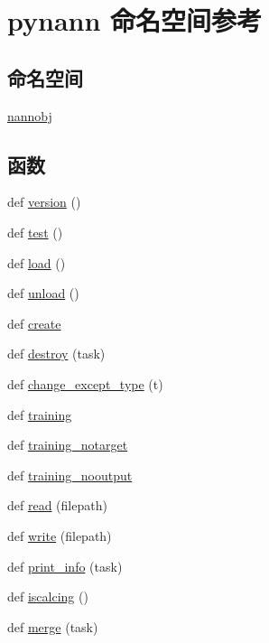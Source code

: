 \hypertarget{namespacepynann}{}\section{pynann 命名空间参考}
\label{namespacepynann}
\subsection*{命名空间}
\begin{DoxyCompactItemize}
\item 
 \hyperlink{namespacepynann_1_1nannobj}{nannobj}
\end{DoxyCompactItemize}
\subsection*{函数}
\begin{DoxyCompactItemize}
\item 
def \hyperlink{namespacepynann_a4dd5d3bc6dc56e2456e6b7f9b7215ab7}{version} ()
\item 
def \hyperlink{namespacepynann_ada5f3e7105e806c2bc05a8e63a32b57e}{test} ()
\item 
def \hyperlink{namespacepynann_ace6e3d4e6aacb9f2d3e26bb3e917ae76}{load} ()
\item 
def \hyperlink{namespacepynann_ad3feafb695c7b9b3c9471dcf601f43e4}{unload} ()
\item 
def \hyperlink{namespacepynann_ab15b41c10f9568d70c75b1c8a41ebdda}{create}
\item 
def \hyperlink{namespacepynann_a1bf1031bdd7b52dc5f2f3e113ae55681}{destroy} (task)
\item 
def \hyperlink{namespacepynann_a4cfc87f32d6180e32a6cff7986ba2a3f}{change\+\_\+except\+\_\+type} (t)
\item 
def \hyperlink{namespacepynann_ae2b74b90563f7fb83c6472fef6aaaeba}{training}
\item 
def \hyperlink{namespacepynann_a00afa3409ad462a7cc3c2d8914dc80c6}{training\+\_\+notarget}
\item 
def \hyperlink{namespacepynann_a3f39ce22cdaec6e20913632fc10b0613}{training\+\_\+nooutput}
\item 
def \hyperlink{namespacepynann_a4fabfddf6731106757ddf26899f73e2a}{read} (filepath)
\item 
def \hyperlink{namespacepynann_a897d7a8f954b4e97578e0044f653fa10}{write} (filepath)
\item 
def \hyperlink{namespacepynann_a9ea87f485af0cd4098ae8fdb2bb69f5f}{print\+\_\+info} (task)
\item 
def \hyperlink{namespacepynann_a3e79311e297d87898c02a6ec0cd6f578}{iscalcing} ()
\item 
def \hyperlink{namespacepynann_ac514bb724edbcb6fdcf70e8d6baacc19}{merge} (task)
\end{DoxyCompactItemize}
